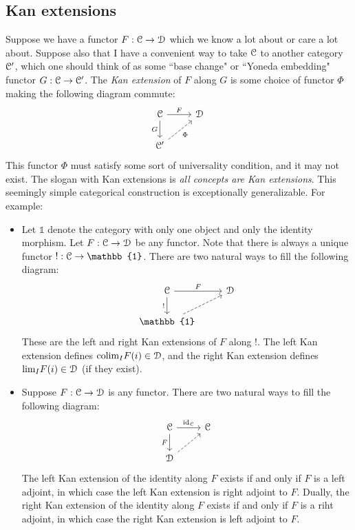 \documentclass[10pt]{amsart}
\newcommand{\euscr}[1]{\EuScript{#1}}
\theoremstyle{definition}
\newcommand{\cdef}[1]{\textcolor{Bittersweet}{#1}}
\begin{document}
\subsection*{Kan extensions}
Suppose we have a functor $F:\euscr{C} \to \euscr{D}$ which we know a lot about or care a lot about. Suppose also that I have a convenient way to take $\euscr{C}$ to another category $\euscr{C}'$, which one should think of as some ``base change" or ``Yoneda embedding" functor $G:\euscr{C} \to \euscr{C}'$. The \cdef{\emph{Kan extension}} of $F$ along $G$ is some choice of functor $\Phi$ making the following diagram commute:
\[\begin{tikzcd}
	{\euscr{C}} & {\euscr{D}} \\
	{\euscr{C}'}
	\arrow["F", from=1-1, to=1-2]
	\arrow["G"', from=1-1, to=2-1]
	\arrow["\Phi"', dashed, from=2-1, to=1-2]
\end{tikzcd}\]
This functor $\Phi$ must satisfy some sort of universality condition, and it may not exist. The slogan with Kan extensions is \cdef{\emph{all concepts are Kan extensions}}. This seemingly simple categorical construction is exceptionally generalizable. For example:
\begin{itemize}
    \item Let $\mathbb{1}$ denote the category with only one object and only the identity morphism. Let $F:\euscr{C} \to \euscr{D}$ be any functor. Note that there is always a unique functor $!:\euscr{C} \to \mathbb{1}$. There are two natural ways to fill the following diagram:
    \[
    \begin{tikzcd}
	{\euscr{C}} & {\euscr{D}} \\
	{\mathbb{1}}
	\arrow["F", from=1-1, to=1-2]
	\arrow["{!}"', from=1-1, to=2-1]
	\arrow[dashed, from=2-1, to=1-2]
    \end{tikzcd}
    \]
    These are the left and right Kan extensions of $F$ along $!$. The left Kan extension defines $\text{colim}_IF(i) \in \euscr{D}$, and the right Kan extension defines $\text{lim}_IF(i) \in \euscr{D}$ (if they exist).
    \item Suppose $F:\euscr{C} \to \euscr{D}$ is any functor. There are two natural ways to fill the following diagram:
    \[
    \begin{tikzcd}
	{\euscr{C}} & {\euscr{C}} \\
	{\euscr{D}}
	\arrow["{\text{id}_\euscr{C}}", from=1-1, to=1-2]
	\arrow["F"', from=1-1, to=2-1]
	\arrow[dashed, from=2-1, to=1-2]
    \end{tikzcd}
    \]
    The left Kan extension of the identity along $F$ exists if and only if $F$ is a left adjoint, in which case the left Kan extension is right adjoint to $F$. Dually, the right Kan extension of the identity along $F$ exists if and only if $F$ is a riht adjoint, in which case the right Kan extension is left adjoint to $F$.
\end{itemize}
\end{document}
